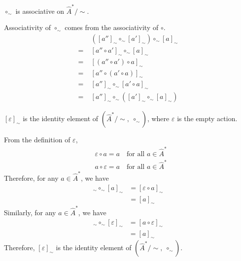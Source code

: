 \begin{propositionE}
\label{prp:circ_sim_associative}
    $\circ_{\sim}$ is associative on $\hat{A}^{*}/\sim$.
\end{propositionE}
\begin{proofE}
Associativity of $\circ_{\sim}$ comes from the associativity of $\circ$.
\begin{align}
         & ([a'']_{\sim} \circ_{\sim} [a']_{\sim}) \circ_{\sim} [a]_{\sim} \\
    = \; & [a'' \circ a']_{\sim} \circ_{\sim} [a]_{\sim}                   \\
    = \; & [ (a'' \circ a') \circ a ]_{\sim}                               \\
    = \; & [ a'' \circ (a' \circ a) ]_{\sim}                               \\
    = \; & [a'']_{\sim} \circ_{\sim} [a' \circ a]_{\sim}                   \\
    = \; & [a'']_{\sim} \circ_{\sim} ([a']_{\sim} \circ_{\sim} [a]_{\sim})
\end{align}
\end{proofE}


\begin{propositionE}
\label{prp:A_sim_identity}
    $[\varepsilon]_{\sim}$ is the identity element of $(\hat{A}^{*}/\sim, \; \circ_{\sim})$, where $\varepsilon$ is the empty action.
\end{propositionE}
\begin{proofE}
    From the definition of $\varepsilon$,
    \begin{align}
        & \varepsilon \circ a = a \quad \text{for all $a \in \hat{A}^{*}$} \\
        & a \circ \varepsilon = a \quad \text{for all $a \in \hat{A}^{*}$}
    \end{align}
    Therefore, for any $a \in \hat{A}^{*}$, we have
    \begin{align}
        [\varepsilon]_{\sim} \circ_{\sim} [a]_{\sim} & = [\varepsilon \circ a]_{\sim} \\
        & = [a]_{\sim}
    \end{align}
    Similarly, for any $a \in \hat{A}^{*}$, we have
    \begin{align}
        [a]_{\sim} \circ_{\sim} [\varepsilon]_{\sim} & = [a \circ \varepsilon]_{\sim} \\
        & = [a]_{\sim}
    \end{align}
    Therefore, $[\varepsilon]_{\sim}$ is the identity element of $(\hat{A}^{*}/\sim, \; \circ_{\sim})$.
\end{proofE}


